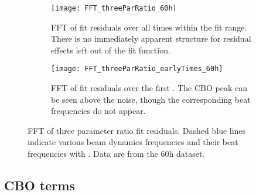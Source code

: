 \begin{figure}
\centering
    \begin{subfigure}[t]{0.67\textwidth}
        \centering
        \texttt{[image: FFT\_threeParRatio\_60h]}
        \caption{FFT of fit residuals over all times within the fit range. There is no immediately apparent structure for residual effects left out of the fit function.}
    \end{subfigure}%

    \begin{subfigure}[t]{0.67\textwidth}
        \centering
        \texttt{[image: FFT\_threeParRatio\_earlyTimes\_60h]}
        \caption{FFT of fit residuals over the first . The CBO peak can be seen above the noise, though the corresponding beat frequencies do not appear.}
    \end{subfigure}
\caption[FFT of three parameter ratio fit residuals]{FFT of three parameter ratio fit residuals. Dashed blue lines indicate various beam dynamics frequencies and their beat frequencies with \wa. Data are from the 60h dataset.}
\label{fig:fft_threeParamRatio}
\end{figure}




\subsection{CBO terms}
\label{sub:cboterms}


